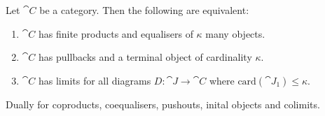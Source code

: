 \documentclass{article}
\begin{document}
\begin{proposition}[Awodey p. 105]
    Let $\cat C$ be a category. Then the following are equivalent:
    \begin{enumerate}
        \item $\cat C$ has finite products and equalisers of $\kappa$ many objects.
        \item $\cat C$ has pullbacks and a terminal object of cardinality $\kappa$.
        \item $\cat C$ has limits for all diagrams $D:\cat J\to\cat C$ where $\text{card}(\cat J_1)\leq \kappa$.
    \end{enumerate}
    Dually for coproducts, coequalisers, pushouts, inital objects and colimits.
\end{proposition}
\end{document}

